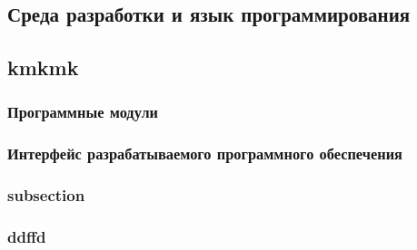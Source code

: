 \subsection{Среда разработки и язык программирования}
\subsection{kmkmk}


\subsubsection{Программные модули}
\subsubsection{Интерфейс разрабатываемого программного обеспечения}

\subsubsection{subsection}

\subsubsection[3]{ddffd}

